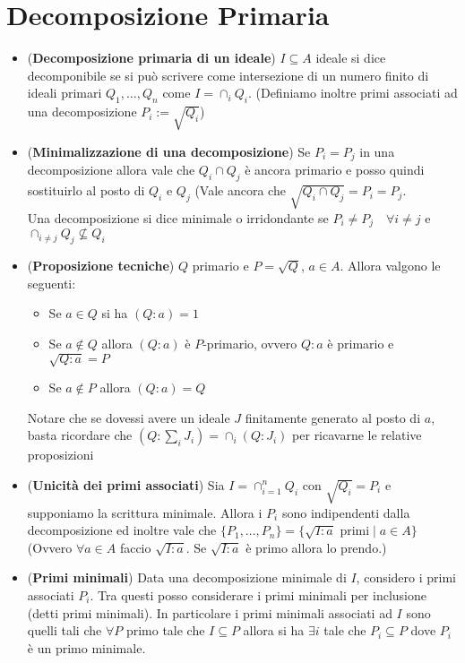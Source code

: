 \documentclass[a4paper,NoNotes,GeneralMath]{stdmdoc}
\begin{document}
	\section*{Decomposizione Primaria}
	\begin{itemize}
		\item ({\bf Decomposizione primaria di un ideale}) $I \subseteq A$ ideale si dice decomponibile se si può scrivere come intersezione di un numero finito di ideali primari $Q_1, \ldots, Q_n$ come $I = \cap_i Q_i$. (Definiamo inoltre primi associati ad una decomposizione $P_i := \sqrt{Q_i}$)
		\item ({\bf Minimalizzazione di una decomposizione}) Se $P_i = P_j$ in una decomposizione allora vale che $Q_i \cap Q_j$ è ancora primario e posso quindi sostituirlo al posto di $Q_i$ e $Q_j$ (Vale ancora che $\sqrt{Q_i \cap Q_j} = P_i = P_j$. \\
		Una decomposizione si dice minimale o irridondante se $P_i \neq P_j \quad \forall i \neq j$ e $\cap_{i\neq j} Q_j \not\subseteq Q_i$
		\item ({\bf Proposizione tecniche}) $Q$ primario e $P = \sqrt{Q}$, $a \in A$. Allora valgono le seguenti:
			\begin{itemize}
				\item Se $a \in Q$ si ha $(Q : a) = 1$
				\item Se $a \notin Q$ allora $(Q : a)$ è $P$-primario, ovvero $Q:a$ è primario e $\sqrt{Q:a} = P$
				\item Se $a \notin P$ allora $(Q : a) = Q$
			\end{itemize}
			Notare che se dovessi avere un ideale $J$ finitamente generato al posto di $a$, basta ricordare che $(Q : \sum_i J_i) = \cap_i (Q : J_i)$ per ricavarne le relative proposizioni
		\item ({\bf Unicità dei primi associati}) Sia $I = \cap_{i=1}^n Q_i$ con $\sqrt{Q_i} = P_i$ e supponiamo la scrittura minimale. Allora i $P_i$ sono indipendenti dalla decomposizione ed inoltre vale che $\{P_1, \ldots, P_n\} = \{ \sqrt{I:a} \text{ primi} \mid a \in A \}$ (Ovvero $\forall a \in A$ faccio $\sqrt{I:a}$. Se $\sqrt{I:a}$ è primo allora lo prendo.)
		\item ({\bf Primi minimali}) Data una decomposizione minimale di $I$, considero i primi associati $P_i$. Tra questi posso considerare i primi minimali per inclusione (detti primi minimali). In particolare i primi minimali associati ad $I$ sono quelli tali che $\forall P$ primo tale che $I \subseteq P$ allora si ha $\exists i$ tale che $P_i \subseteq P$ dove $P_i$ è un primo minimale.

\end{itemize}
\end{document}
